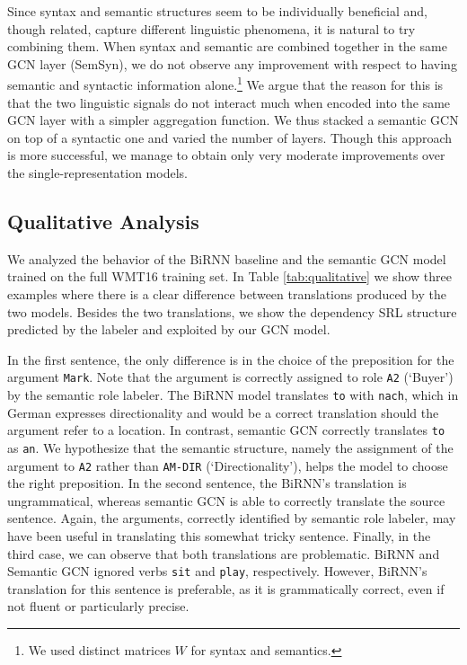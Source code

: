 \documentclass[11pt,a4paper]{article}
\begin{document}
Since syntax and semantic structures seem to be individually beneficial and, though related, capture different linguistic phenomena, it is natural to try combining them.
When syntax and semantic are combined together in the same GCN layer (SemSyn),  we do not observe any improvement with respect to having semantic and syntactic information alone.\footnote{We used distinct  matrices $W$ for syntax and semantics.}  
We argue that the reason for this is that the two linguistic signals do not interact much when encoded into the same GCN layer with a simpler aggregation function.
We thus stacked a semantic GCN on top of a syntactic one and varied the number of layers. 
Though this approach is more successful, we manage to obtain only very moderate improvements over the single-representation models.

\subsection{Qualitative Analysis}
We analyzed the behavior of the BiRNN baseline and the semantic GCN model trained on the full WMT16 training set.
In Table \ref{tab:qualitative} we show three examples where there is a clear difference between translations produced by the two models. Besides the two translations, we show the dependency SRL structure predicted by the labeler and exploited by our GCN model. 

In the first sentence, the only difference is in the choice of the preposition for the argument \texttt{Mark}. Note that the argument is correctly assigned to role \texttt{A2} (`Buyer') by the semantic role labeler. 
The BiRNN model translates \texttt{to} with \texttt{nach}, which in German expresses directionality and would be a correct translation should the argument refer to a location.
In contrast, semantic GCN correctly translates {\tt to} as \texttt{an}.
We hypothesize that the semantic structure, namely the assignment of the argument to {\tt A2} rather than {\tt AM-DIR} (`Directionality'), helps the model to choose the right preposition. 
In the second sentence, the BiRNN's translation is ungrammatical, whereas semantic GCN is able to correctly translate the source sentence. Again, the arguments, correctly identified by semantic role labeler, may have been useful in translating this somewhat tricky sentence.
Finally, in the third case, we can observe that both translations are problematic.
BiRNN and Semantic GCN ignored  verbs {\tt sit} and  {\tt play}, respectively.
However, BiRNN's translation for this sentence is preferable, as it is grammatically correct, even if not fluent or particularly precise.  
\end{document}
